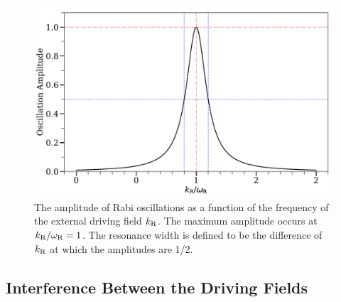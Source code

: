 \begin{figure}[htbp]
    \centering
    \includegraphics[width=\textwidth]{chapters/assets/app/rabi-resonance-width}
    \caption{The amplitude of Rabi oscillations as a function of the frequency of the external driving field $k_\mathrm R$. The maximum amplitude occurs at $k_\mathrm R/\omega_\mathrm R=1$. The resonance width is defined to be the difference of $k_\mathrm R$ at which the amplitudes are 1/2.}
    \label{app-fig:rabi-resonance-width}
\end{figure}

\subsection{Interference Between the Driving Fields}

